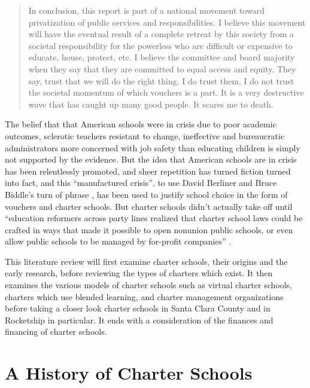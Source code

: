 \begin{quote}\OnehalfSpacing%
In conclusion, this report is part of a national movement toward privatization of public services and responsibilities.
I believe this movement will have the eventual result of a complete retreat by this society from a societal responsibility for the powerless who are difficult or expensive to educate, house, protect, etc. I believe the committee and board majority when they say that they are committed to equal access and equity. They say, trust that we will do the right thing. I do trust them, I do not trust the societal momentum of which vouchers is a part. It is a very destructive wave that has caught up many good people. It scares me to death. 
\end{quote}

The belief that that American schools were in crisis due to poor academic outcomes, sclerotic teachers resistant to change, ineffective and bureaucratic administrators more concerned with job safety than educating children is simply not supported by the evidence. But the idea that American schools are in crisis has been relentlessly promoted, and sheer repetition has turned fiction turned into fact, and this ``manufactured crisis'', to use David Berliner and Bruce Biddle's turn of phrase \parencite{Berliner.Biddle1997}, has been used to justify school choice in the form of vouchers and charter schools. But charter schools didn't actually take off until ``education reformers across party lines realized that charter school laws could be crafted in ways that made it possible to open nonunion public schools, or even allow public schools to be managed by for-profit companies'' \parencite[172]{Goldstein2015a}.

This literature review will first examine charter schools, their origins and the early research, before reviewing the types of charters which exist. It then examines the various models of charter schools such as virtual charter schools, charters which use blended learning, and charter management organizations before taking a closer look charter schools in Santa Clara County and in Rocketship in particular. It ends with a consideration of the finances and financing of charter schools.

\section{A History of Charter Schools}\label{sec:history}\indent

